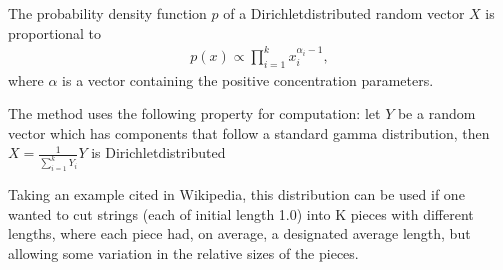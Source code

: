 \documentclass[letterpaper,10pt,english]{sphinxmanual}
\begin{document}
\begin{fulllineitems}
The probability density function \(p\) of a
Dirichlet\sphinxhyphen{}distributed random vector \(X\) is
proportional to
\begin{equation*}
\begin{split}p(x) \propto \prod_{i=1}^{k}{x^{\alpha_i-1}_i},\end{split}
\end{equation*}
where \(\alpha\) is a vector containing the positive
concentration parameters.

The method uses the following property for computation: let \(Y\)
be a random vector which has components that follow a standard gamma
distribution, then \(X = \frac{1}{\sum_{i=1}^k{Y_i}} Y\)
is Dirichlet\sphinxhyphen{}distributed

Taking an example cited in Wikipedia, this distribution can be used if
one wanted to cut strings (each of initial length 1.0) into K pieces
with different lengths, where each piece had, on average, a designated
average length, but allowing some variation in the relative sizes of
the pieces.

\begin{sphinxVerbatim}[commandchars=\\\{\}]
     
\end{sphinxVerbatim}

\begin{sphinxVerbatim}[commandchars=\\\{\}]
   
 \PYG{p}{[}\PYG{p}{]}
 \PYG{p}{[}\PYG{p}{]} \PYG{p}{[}\PYG{p}{]} 
 \PYG{p}{[}\PYG{p}{]} \PYG{p}{[}\PYG{p}{]}\PYG{p}{[}\PYG{p}{]} 
\end{sphinxVerbatim}

\end{fulllineitems}
\end{document}
